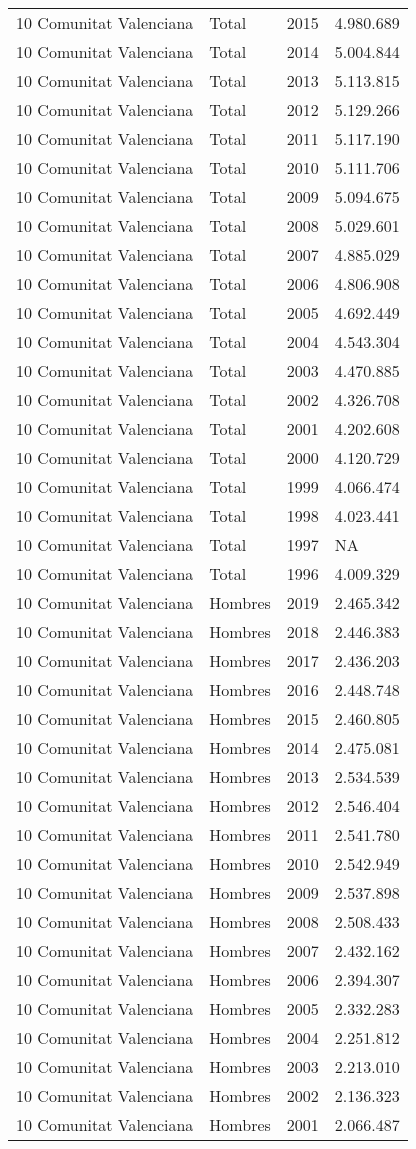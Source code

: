 \documentclass[
]{article}
\begin{document}
\begin{longtable}[]{@{}llrl@{}}
10 Comunitat Valenciana & Total & 2015 & 4.980.689\tabularnewline
10 Comunitat Valenciana & Total & 2014 & 5.004.844\tabularnewline
10 Comunitat Valenciana & Total & 2013 & 5.113.815\tabularnewline
10 Comunitat Valenciana & Total & 2012 & 5.129.266\tabularnewline
10 Comunitat Valenciana & Total & 2011 & 5.117.190\tabularnewline
10 Comunitat Valenciana & Total & 2010 & 5.111.706\tabularnewline
10 Comunitat Valenciana & Total & 2009 & 5.094.675\tabularnewline
10 Comunitat Valenciana & Total & 2008 & 5.029.601\tabularnewline
10 Comunitat Valenciana & Total & 2007 & 4.885.029\tabularnewline
10 Comunitat Valenciana & Total & 2006 & 4.806.908\tabularnewline
10 Comunitat Valenciana & Total & 2005 & 4.692.449\tabularnewline
10 Comunitat Valenciana & Total & 2004 & 4.543.304\tabularnewline
10 Comunitat Valenciana & Total & 2003 & 4.470.885\tabularnewline
10 Comunitat Valenciana & Total & 2002 & 4.326.708\tabularnewline
10 Comunitat Valenciana & Total & 2001 & 4.202.608\tabularnewline
10 Comunitat Valenciana & Total & 2000 & 4.120.729\tabularnewline
10 Comunitat Valenciana & Total & 1999 & 4.066.474\tabularnewline
10 Comunitat Valenciana & Total & 1998 & 4.023.441\tabularnewline
10 Comunitat Valenciana & Total & 1997 & NA\tabularnewline
10 Comunitat Valenciana & Total & 1996 & 4.009.329\tabularnewline
10 Comunitat Valenciana & Hombres & 2019 & 2.465.342\tabularnewline
10 Comunitat Valenciana & Hombres & 2018 & 2.446.383\tabularnewline
10 Comunitat Valenciana & Hombres & 2017 & 2.436.203\tabularnewline
10 Comunitat Valenciana & Hombres & 2016 & 2.448.748\tabularnewline
10 Comunitat Valenciana & Hombres & 2015 & 2.460.805\tabularnewline
10 Comunitat Valenciana & Hombres & 2014 & 2.475.081\tabularnewline
10 Comunitat Valenciana & Hombres & 2013 & 2.534.539\tabularnewline
10 Comunitat Valenciana & Hombres & 2012 & 2.546.404\tabularnewline
10 Comunitat Valenciana & Hombres & 2011 & 2.541.780\tabularnewline
10 Comunitat Valenciana & Hombres & 2010 & 2.542.949\tabularnewline
10 Comunitat Valenciana & Hombres & 2009 & 2.537.898\tabularnewline
10 Comunitat Valenciana & Hombres & 2008 & 2.508.433\tabularnewline
10 Comunitat Valenciana & Hombres & 2007 & 2.432.162\tabularnewline
10 Comunitat Valenciana & Hombres & 2006 & 2.394.307\tabularnewline
10 Comunitat Valenciana & Hombres & 2005 & 2.332.283\tabularnewline
10 Comunitat Valenciana & Hombres & 2004 & 2.251.812\tabularnewline
10 Comunitat Valenciana & Hombres & 2003 & 2.213.010\tabularnewline
10 Comunitat Valenciana & Hombres & 2002 & 2.136.323\tabularnewline
10 Comunitat Valenciana & Hombres & 2001 & 2.066.487\tabularnewline

\end{longtable}
\end{document}
